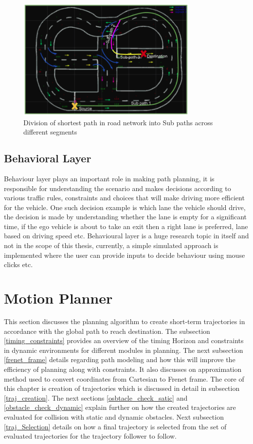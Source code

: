 \begin{figure}[H]
    \centering
    \includegraphics[width=0.8\textwidth]{Images/path_Segmentation.png}
    \caption{Division of shortest path in road network into Sub paths across different segments}
    \label{path_Segmentation}
\end{figure}

\subsection{Behavioral Layer}
Behaviour layer plays an important role in making path planning, it is responsible for understanding the scenario and makes decisions according to various traffic rules, constraints and choices that will make driving more efficient for the vehicle. One such decision example is which lane the vehicle should drive, the decision is made by understanding whether the lane is empty for a significant time, if the ego vehicle is about to take an exit then a right lane is preferred, lane based on driving speed etc. Behavioural layer is a huge research topic in itself and not in the scope of this thesis, currently, a simple simulated approach is implemented where the user can provide inputs to decide behaviour using mouse clicks etc.

\section{Motion Planner} \label{motion_planner}

This section discusses the planning algorithm to create short-term trajectories in accordance with the global path to reach destination. The subsection \ref{timing_constraints} provides an overview of the timing Horizon and constraints in dynamic environments for different modules in planning. The next subsection \ref{frenet_frame} details regarding path modeling and how this will improve the efficiency of planning along with constraints. It also discusses on approximation method used to convert coordinates from Cartesian to Frenet frame. The core of this chapter is creation of trajectories which is discussed in detail in subsection \ref{traj_creation}. The next sections \ref{osbtacle_check_satic} and \ref{obstacle_check_dynamic} explain further on how the created trajectories are evaluated for collision with static and dynamic obstacles. Next subsection \ref{traj_Selection} details on how a final trajectory is selected from the set of evaluated trajectories for the trajectory follower to follow.

